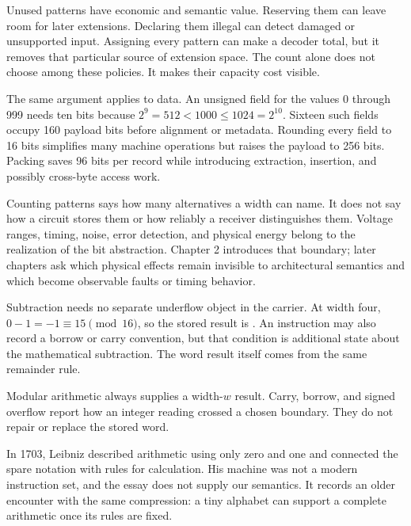 Unused patterns have economic and semantic value. Reserving them can leave
room for later extensions. Declaring them illegal can detect damaged or
unsupported input. Assigning every pattern can make a decoder total, but it
removes that particular source of extension space. The count alone does not
choose among these policies. It makes their capacity cost visible.

The same argument applies to data. An unsigned field for the values 0 through
999 needs ten bits because \(2^9=512<1000\leq1024=2^{10}\). Sixteen such
fields occupy 160 payload bits before alignment or metadata. Rounding every
field to 16 bits simplifies many machine operations but raises the payload to
256 bits. Packing saves 96 bits per record while introducing extraction,
insertion, and possibly cross-byte access work.

\begin{goingdeeper}[title={\iconGoingDeeper\ Capacity is not physical reliability}]
Counting patterns says how many alternatives a width can name. It does not
say how a circuit stores them or how reliably a receiver distinguishes them.
Voltage ranges, timing, noise, error detection, and physical energy belong to
the realization of the bit abstraction. Chapter 2 introduces that boundary;
later chapters ask which physical effects remain invisible to architectural
semantics and which become observable faults or timing behavior.
\end{goingdeeper}

Subtraction needs no separate underflow object in the carrier. At width four,
\(0-1=-1\equiv15\pmod{16}\), so the stored result is . An
instruction may also record a borrow or carry convention, but that condition
is additional state about the mathematical subtraction. The word result
itself comes from the same remainder rule.

\begin{keyidea}[title={The carrier and the condition answer different questions}]
Modular arithmetic always supplies a width-\(w\) result. Carry, borrow, and
signed overflow report how an integer reading crossed a chosen boundary. They
do not repair or replace the stored word.
\end{keyidea}

\begin{archive}[title={\iconArchive\ Binary arithmetic before electronic computers}]
In 1703, Leibniz described arithmetic using only zero and one and connected
the spare notation with rules for calculation. His machine was not a modern
instruction set, and the essay does not supply our semantics. It records an
older encounter with the same compression: a tiny alphabet can support a
complete arithmetic once its rules are fixed.\autocite{leibniz1703binary}
\end{archive}

